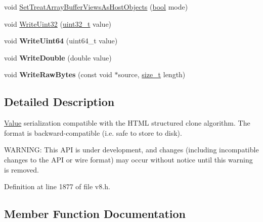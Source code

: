 \begin{DoxyCompactItemize}
\item 
void \mbox{\hyperlink{classv8_1_1ValueSerializer_ae5e570983dfe928e15d6cc56755248c4}{Set\+Treat\+Array\+Buffer\+Views\+As\+Host\+Objects}} (\mbox{\hyperlink{classbool}{bool}} mode)
\item 
void \mbox{\hyperlink{classv8_1_1ValueSerializer_a8345af97eb58727384cab6a2738924d1}{Write\+Uint32}} (\mbox{\hyperlink{classuint32__t}{uint32\+\_\+t}} value)
\item 
\mbox{\label{classv8_1_1ValueSerializer_a48a33b02dc8dd383be655e5627c0a070}} 
void {\bfseries Write\+Uint64} (uint64\+\_\+t value)
\item 
\mbox{\label{classv8_1_1ValueSerializer_a4da99527143807156385004385e98ed8}} 
void {\bfseries Write\+Double} (double value)
\item 
\mbox{\label{classv8_1_1ValueSerializer_ae01d5c86517fad7ad1c191b9ff6c30e7}} 
void {\bfseries Write\+Raw\+Bytes} (const void $\ast$source, \mbox{\hyperlink{classsize__t}{size\+\_\+t}} length)
\end{DoxyCompactItemize}


\subsection{Detailed Description}
\mbox{\hyperlink{classv8_1_1Value}{Value}} serialization compatible with the H\+T\+ML structured clone algorithm. The format is backward-\/compatible (i.\+e. safe to store to disk).

W\+A\+R\+N\+I\+NG\+: This A\+PI is under development, and changes (including incompatible changes to the A\+PI or wire format) may occur without notice until this warning is removed. 

Definition at line 1877 of file v8.\+h.



\subsection{Member Function Documentation}
\mbox{\label{classv8_1_1ValueSerializer_a5e15aee37a321fd0dc3e92dd87e1334f}} 
